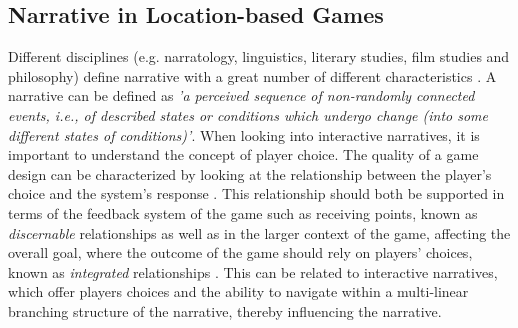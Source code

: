 \subsection{Narrative in Location-based Games}
Different disciplines (e.g. narratology, linguistics, literary studies, film studies and philosophy) define narrative with a great number of different characteristics \cite{Grimaldi}. A narrative can be defined as \emph{'a perceived sequence of non-randomly connected events, i.e., of described states or conditions which undergo change (into some different states of conditions)'}\cite{narrativeDef}. When looking into interactive narratives, it is important to understand the concept of player choice. The quality of a game design can be characterized by looking at the relationship between the player’s choice and the system’s response \cite{RulesofPlay}. This relationship should both be supported in terms of the feedback system of the game such as receiving points, known as \textit{discernable} relationships as well as in the larger context of the game, affecting the overall goal, where the outcome of the game should rely on players' choices, known as \textit{integrated} relationships \cite{RulesofPlay}. This can be related to interactive narratives, which offer players choices and the ability to navigate within a multi-linear branching structure of the narrative, thereby influencing the narrative\cite{ryanavatars}. 


